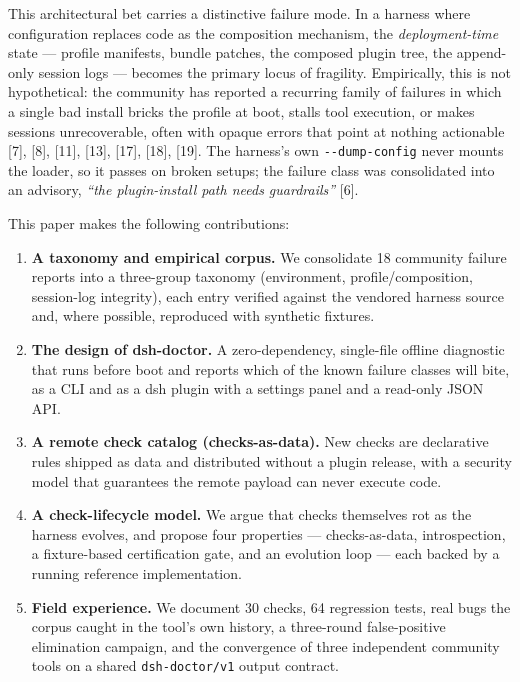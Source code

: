 \documentclass[11pt]{article}
\begin{document}
This architectural bet carries a distinctive failure mode. In a harness
where configuration replaces code as the composition mechanism, the
\emph{deployment-time} state --- profile manifests, bundle patches, the
composed plugin tree, the append-only session logs --- becomes the
primary locus of fragility. Empirically, this is not hypothetical: the
community has reported a recurring family of failures in which a single
bad install bricks the profile at boot, stalls tool execution, or makes
sessions unrecoverable, often with opaque errors that point at nothing
actionable [7], [8], [11], [13], [17], [18],
[19]. The harness's own \texttt{-\/-dump-config} never mounts the
loader, so it passes on broken setups; the failure class was
consolidated into an advisory, \emph{``the plugin-install path needs
guardrails''} [6].

This paper makes the following contributions:

\begin{enumerate}
\def\labelenumi{\arabic{enumi}.}
\item
  \textbf{A taxonomy and empirical corpus.} We consolidate 18 community
  failure reports into a three-group taxonomy (environment,
  profile/composition, session-log integrity), each entry verified
  against the vendored harness source and, where possible, reproduced
  with synthetic fixtures.
\item
  \textbf{The design of dsh-doctor.} A zero-dependency, single-file
  offline diagnostic that runs before boot and reports which of the
  known failure classes will bite, as a CLI and as a dsh plugin with a
  settings panel and a read-only JSON API.
\item
  \textbf{A remote check catalog (checks-as-data).} New checks are
  declarative rules shipped as data and distributed without a plugin
  release, with a security model that guarantees the remote payload can
  never execute code.
\item
  \textbf{A check-lifecycle model.} We argue that checks themselves rot
  as the harness evolves, and propose four properties ---
  checks-as-data, introspection, a fixture-based certification gate, and
  an evolution loop --- each backed by a running reference
  implementation.
\item
  \textbf{Field experience.} We document 30 checks, 64 regression tests,
  real bugs the corpus caught in the tool's own history, a three-round
  false-positive elimination campaign, and the convergence of three
  independent community tools on a shared \texttt{dsh-doctor/v1} output
  contract.
\end{enumerate}
\end{document}
